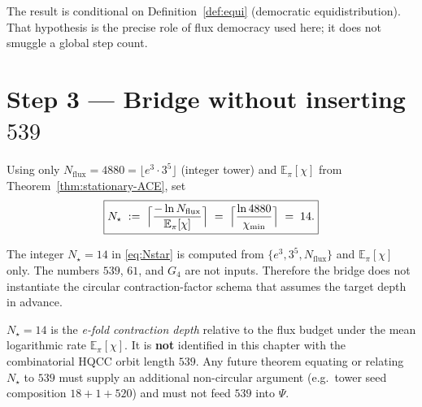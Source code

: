 \begin{remark}[Scope]
The result is conditional on Definition~\ref{def:equi} (democratic
equidistribution). That hypothesis is the precise role of flux democracy
used here; it does not smuggle a global step count.
\end{remark}

\section{Step 3 --- Bridge without inserting \(539\)}
\label{sec:bridge}

\begin{definition}
\label{def:bridge}
Using only \(N_{\mathrm{flux}}=4880=\lfloor e^3\cdot 3^5\rfloor\) (integer tower)
and \(\mathbb{E}_\pi[\chi]\) from Theorem~\ref{thm:stationary-ACE}, set
\begin{equation}
\boxed{
N_\star
\;:=\;
\Bigl\lceil
\frac{-\ln N_{\mathrm{flux}}}{\mathbb{E}_\pi[\chi]}
\Bigr\rceil
\;=\;
\Bigl\lceil
\frac{\ln 4880}{\chi_{\min}}
\Bigr\rceil
\;=\;
14.
}
\label{eq:Nstar}
\end{equation}
\end{definition}

\begin{theorem}
\label{thm:bridge}
The integer \(N_\star=14\) in \eqref{eq:Nstar} is computed from
\(\{e^3,3^5,N_{\mathrm{flux}}\}\) and \(\mathbb{E}_\pi[\chi]\) only. The numbers
\(539\), \(61\), and \(G_4\) are not inputs. Therefore the bridge does not
instantiate the circular contraction-factor schema that assumes the target
depth in advance.
\end{theorem}

\begin{remark}
\label{rem:no-539}
\(N_\star=14\) is the \emph{e-fold contraction depth} relative to the flux
budget under the mean logarithmic rate \(\mathbb{E}_\pi[\chi]\). It is
\textbf{not} identified in this chapter with the combinatorial HQCC orbit
length \(539\). Any future theorem equating or relating \(N_\star\) to \(539\)
must supply an additional non-circular argument (e.g.\ tower seed composition
\(18+1+520\)) and must not feed \(539\) into \(\Psi\).
\end{remark}

